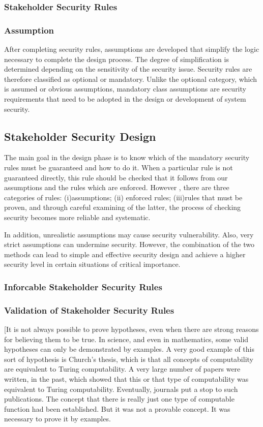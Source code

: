 \subsubsection{Stakeholder Security Rules}\label{stsecrul}
\subsubsection{Assumption}\label{assmp} 
After completing security rules, assumptions are developed that simplify the logic necessary to complete the design process. The degree of simplification is determined depending on the sensitivity of the security issue. Security rules are therefore classified as optional or mandatory. Unlike the optional category, which is assumed or obvious assumptions, mandatory class assumptions are security requirements that need to be adopted in the design or development of system security.
\subsection{Stakeholder Security Design}\label{stsecdsgn} 
The main goal in the design phase is to know which of the mandatory security rules must be guaranteed and how to do it. When a particular  rule is not guaranteed directly,  this rule should be checked  that it follows from our assumptions and the rules which are enforced. However , there are three categories of rules: (i)assumptions; (ii) enforced rules; (iii)rules that must be proven, and through careful examining of the latter, the process of checking security becomes more reliable and systematic.

In addition, unrealistic assumptions may cause security vulnerability. Also, very strict assumptions can undermine security. However, the combination of the two methods can lead to simple and effective security design and achieve a higher security level in certain situations of critical importance.
\subsubsection{Inforcable Stakeholder Security Rules}\label{Instsecrul}
\subsubsection{Validation of Stakeholder Security Rules}\label{vlstsecrul}

[It is not always possible to prove hypotheses, even when there are strong reasons for believing
them to be true. In science, and even in mathematics, some valid hypotheses can only be demonstrated
by examples. A very good example of this sort of hypothesis is Church's thesis, which is that
all concepts of computability are equivalent to Turing computability. A very large number of papers
were written, in the past, which showed that this or that type of computability was equivalent to
Turing computability. Eventually, journals put a stop to such publications. The concept that there is
really just one type of computable function had been established. But it was not a provable concept.
It was necessary to prove it by examples.

